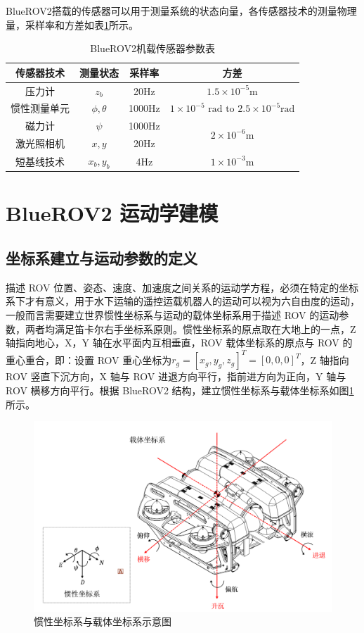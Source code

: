 BlueROV2搭载的传感器可以用于测量系统的状态向量，各传感器技术的测量物理量，采样率和方差如表\ref{t.sensors}所示。
\begin{table}[htb]
  \centering
  \caption{BlueROV2机载传感器参数表}
  
  \label{t.sensors}
  \begin{tabular}{cccc}
  \hline
传感器技术 & 测量状态  & 采样率 & 方差 \\
\hline
压力计 & $z_b$ & 20Hz & $1.5\times 10^{-5}\text{m}$ \\
惯性测量单元 & $\phi, \theta$ & 1000Hz & $1\times 10^{-5}\text{ rad to } 2.5\times 10^{-5}\text{rad}$ \\
磁力计 & $\psi$ & 1000Hz & \multirow{2}{*}{$2\times 10^{-6}\text{m}$} \\
激光照相机 & $x, y$ & 20Hz & \\
短基线技术 & $x_b, y_b$ & 4Hz & $1\times 10^{-3}\text{m}$\\
\hline
\end{tabular}
\end{table}

\section{BlueROV2 运动学建模}
\subsection{坐标系建立与运动参数的定义}

描述 ROV 位置、姿态、速度、加速度之间关系的运动学方程，必须在特定的坐标系下才有意义，用于水下运输的遥控运载机器人的运动可以视为六自由度的运动，一般而言需要建立世界惯性坐标系与运动的载体坐标系用于描述 ROV 的运动参数，两者均满足笛卡尔右手坐标系原则。惯性坐标系的原点取在大地上的一点，Z 轴指向地心，X，Y 轴在水平面内互相垂直，ROV 载体坐标系的原点与 ROV 的重心重合，即：设置 ROV 重心坐标为$r_g=[x_g,y_g,z_g]^T=[0,0,0]^T$，Z 轴指向 ROV 竖直下沉方向，X 轴与 ROV 进退方向平行，指前进方向为正向，Y 轴与 ROV 横移方向平行。根据 BlueROV2 结构，建立惯性坐标系与载体坐标系如图\ref{f.frame_identification}所示。

\begin{figure}[hbt]
    \centering
    \includegraphics[width=0.8\linewidth]{images/chapter2/frame-identification.png}
    \caption{惯性坐标系与载体坐标系示意图}
    \label{f.frame_identification}
\end{figure}

